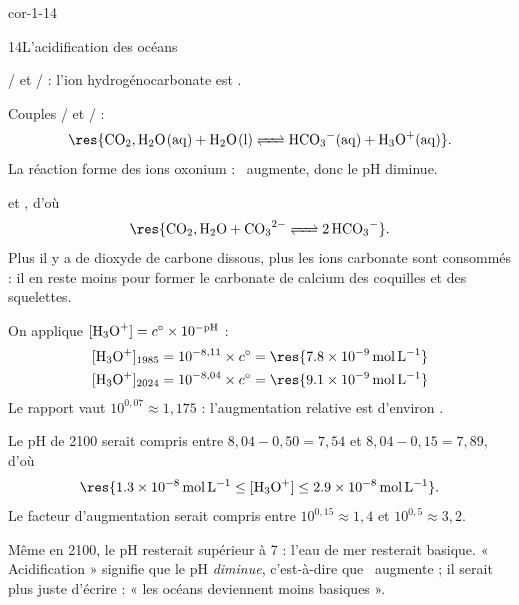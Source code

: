 \begin{blocLivre}{cor-1-14}
\begin{corrige}{14}{L'acidification des océans}
\begin{questions}
\item {}/ et / : l'ion hydrogénocarbonate est .
\item Couples / et / :
\[\res{\ce{CO2,H2O(aq) + H2O(l) <=> HCO3^-(aq) + H3O^+(aq)}}.\]
La réaction forme des ions oxonium : \hho\ augmente, donc le pH diminue.
\item {} et , d'où
\[\res{\ce{CO2,H2O + CO3^2- <=> 2 HCO3-}}.\]
Plus il y a de dioxyde de carbone dissous, plus les ions carbonate sont consommés : il en reste moins
pour former le carbonate de calcium des coquilles et des squelettes.
\item On applique $\hho=\cst\times10^{-\pH}$ :
\begin{gather*}
\hho_{1985}=10^{-8{,}11}\times\cst=\res{\qty{7,8e-9}{mol.L^{-1}}}\\
\hho_{2024}=10^{-8{,}04}\times\cst=\res{\qty{9,1e-9}{mol.L^{-1}}}
\end{gather*}
Le rapport vaut $10^{0{,}07}\approx1{,}175$ : l'augmentation relative est d'environ .
\item Le pH de 2100 serait compris entre $8{,}04-0{,}50=7{,}54$ et $8{,}04-0{,}15=7{,}89$, d'où
\[\res{\qty{1,3e-8}{mol.L^{-1}}\leq\hho\leq\qty{2,9e-8}{mol.L^{-1}}}.\]
Le facteur d'augmentation serait compris entre $10^{0{,}15}\approx1{,}4$ et $10^{0{,}5}\approx3{,}2$.
\item Même en 2100, le pH resterait supérieur à 7 : l'eau de mer resterait basique. « Acidification »
signifie que le pH \emph{diminue}, c'est-à-dire que \hho\ augmente ; il serait plus juste d'écrire :
« les océans deviennent moins basiques ».
\end{questions}
\end{corrige}
\end{blocLivre}
